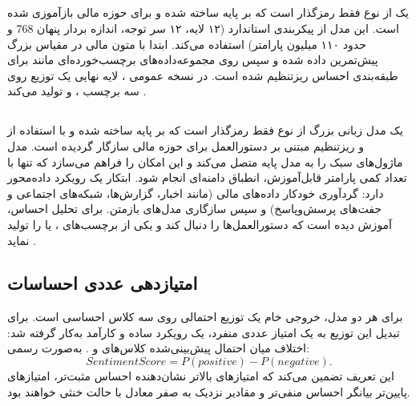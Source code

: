 \documentclass[12pt, a4paper]{report}
\begin{document}
\subsection{}
\label{subsec:finbert}
\textbf{} یک  از نوع فقط رمزگذار است که بر پایه  ساخته شده 
و برای حوزه مالی بازآموزی شده است. 
این مدل از پیکربندی استاندارد  
(۱۲ لایه، ۱۲ سر توجه، اندازه بردار پنهان 768 و حدود ۱۱۰ میلیون پارامتر) استفاده می‌کند.  
 ابتدا با متون مالی در مقیاس بزرگ پیش‌تمرین داده شده 
و سپس روی مجموعه‌داده‌های برچسب‌خورده‌ای مانند  برای طبقه‌بندی احساس ریزتنظیم شده است.  
در نسخه عمومی ، لایه نهایی یک توزیع  
روی سه برچسب ،  و  تولید می‌کند \cite{araci2019finbert}.  

\subsection{}
\label{subsec:fingpt}
 یک مدل زبانی بزرگ از نوع فقط رمزگذار است که بر پایه  ساخته شده 
و با استفاده از  و ریزتنظیم مبتنی بر دستورالعمل برای حوزه مالی سازگار گردیده است.  
مدل  ماژول‌های سبک  را به مدل پایه متصل می‌کند 
و این امکان را فراهم می‌سازد که تنها با تعداد کمی پارامتر قابل‌آموزش، انطباق دامنه‌ای انجام شود.  
ابتکار  یک رویکرد داده‌محور دارد: گردآوری خودکار داده‌های مالی 
(مانند اخبار، گزارش‌ها، شبکه‌های اجتماعی و جفت‌های پرسش‌وپاسخ) و سپس سازگاری مدل‌های بازمتن.  
برای تحلیل احساس،  آموزش دیده است که دستورالعمل‌ها را دنبال کند 
و یکی از برچسب‌های ،  یا  را تولید نماید \cite{yang2023fingpt}.  

\subsection{امتیازدهی عددی احساسات}
برای هر دو مدل، خروجی خام یک توزیع احتمالی روی سه کلاس احساسی است.  
برای تبدیل این توزیع به یک امتیاز عددی منفرد، یک رویکرد ساده و کارآمد به‌کار گرفته شد:  
اختلاف میان احتمال پیش‌بینی‌شده کلاس‌های  و .  
به‌صورت رسمی:
\[
Sentiment Score = P(positive) - P(negative).
\]
این تعریف تضمین می‌کند که امتیازهای بالاتر نشان‌دهنده احساس مثبت‌تر، 
امتیازهای پایین‌تر بیانگر احساس منفی‌تر و مقادیر نزدیک به صفر معادل با حالت خنثی خواهند بود.  
\end{document}
